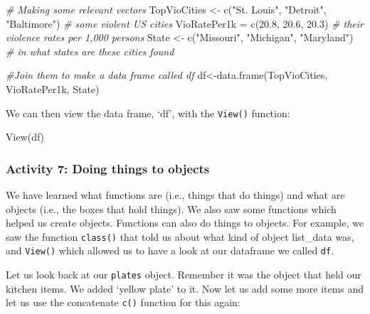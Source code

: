 \documentclass[
]{book}
\newenvironment{Shaded}{\begin{snugshade}}{\end{snugshade}}
\newcommand{\CommentTok}[1]{\textcolor[rgb]{0.56,0.35,0.01}{\textit{#1}}}
\newcommand{\FloatTok}[1]{\textcolor[rgb]{0.00,0.00,0.81}{#1}}
\newcommand{\FunctionTok}[1]{\textcolor[rgb]{0.00,0.00,0.00}{#1}}
\newcommand{\NormalTok}[1]{#1}
\newcommand{\OtherTok}[1]{\textcolor[rgb]{0.56,0.35,0.01}{#1}}
\newcommand{\StringTok}[1]{\textcolor[rgb]{0.31,0.60,0.02}{#1}}
\begin{document}
\begin{Shaded}
\begin{Highlighting}[]
\CommentTok{\# Making some relevant vectors}
\NormalTok{TopVioCities }\OtherTok{\textless{}{-}} \FunctionTok{c}\NormalTok{(}\StringTok{"St. Louis"}\NormalTok{, }\StringTok{"Detroit"}\NormalTok{, }\StringTok{"Baltimore"}\NormalTok{) }\CommentTok{\# some violent US cities}
\NormalTok{VioRatePer1k }\OtherTok{=} \FunctionTok{c}\NormalTok{(}\FloatTok{20.8}\NormalTok{, }\FloatTok{20.6}\NormalTok{, }\FloatTok{20.3}\NormalTok{) }\CommentTok{\# their violence rates per 1,000 persons}
\NormalTok{State }\OtherTok{\textless{}{-}} \FunctionTok{c}\NormalTok{(}\StringTok{"Missouri"}\NormalTok{, }\StringTok{"Michigan"}\NormalTok{, }\StringTok{"Maryland"}\NormalTok{) }\CommentTok{\# in what states are these cities found}

\CommentTok{\#Join them to make a data frame called \textquotesingle{}df\textquotesingle{}}
\NormalTok{df}\OtherTok{\textless{}{-}}\FunctionTok{data.frame}\NormalTok{(TopVioCities, VioRatePer1k, State)}
\end{Highlighting}
\end{Shaded}

We can then view the data frame, `df', with the \texttt{View()} function:

\begin{Shaded}
\begin{Highlighting}[]
\FunctionTok{View}\NormalTok{(df)}
\end{Highlighting}
\end{Shaded}

\hypertarget{activity-7-doing-things-to-objects}{%
\subsubsection{Activity 7: Doing things to objects}\label{activity-7-doing-things-to-objects}}

We have learned what functions are (i.e., things that do things) and what are objects (i.e., the boxes that hold things). We also saw some functions which helped us create objects. Functions can also do things to objects. For example, we saw the function \texttt{class()} that told us about what kind of object list\_data was, and \texttt{View()} which allowed us to have a look at our dataframe we called \texttt{df}.

Let us look back at our \texttt{plates} object. Remember it was the object that held our kitchen items. We added `yellow plate' to it. Now let us add some more items and let us use the concatenate \texttt{c()} function for this again:
\end{document}
